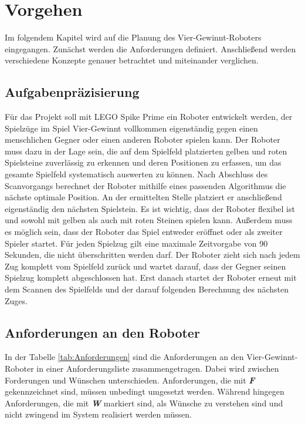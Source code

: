 \chapter{Vorgehen}
Im folgendem Kapitel wird auf die Planung des Vier-Gewinnt-Roboters eingegangen. Zunächst werden die Anforderungen definiert. Anschließend werden verschiedene Konzepte genauer betrachtet und miteinander verglichen.

\section{Aufgabenpräzisierung}
Für das Projekt soll mit LEGO Spike Prime ein Roboter entwickelt werden, der Spielzüge im Spiel Vier-Gewinnt vollkommen eigenständig gegen einen menschlichen Gegner oder einen anderen Roboter spielen kann. Der Roboter muss dazu in der Lage sein, die auf dem Spielfeld platzierten gelben und roten Spielsteine zuverlässig zu erkennen und deren Positionen zu erfassen, um das gesamte Spielfeld systematisch auswerten zu können.\newline
Nach Abschluss des Scanvorgangs berechnet der Roboter mithilfe eines passenden Algorithmus die nächste optimale Position. An der ermittelten Stelle platziert er anschließend eigenständig den nächsten Spielstein. Es ist wichtig, dass der Roboter flexibel ist und sowohl mit gelben als auch mit roten Steinen spielen kann. Außerdem muss es möglich sein, dass der Roboter das Spiel entweder eröffnet oder als zweiter Spieler startet.\newline
Für jeden Spielzug gilt eine maximale Zeitvorgabe von 90 Sekunden, die nicht überschritten werden darf. Der Roboter zieht sich nach jedem Zug komplett vom Spielfeld zurück und wartet darauf, dass der Gegner seinen Spielzug komplett abgeschlossen hat. Erst danach startet der Roboter erneut mit dem Scannen des Spielfelds und der darauf folgenden Berechnung des nächsten Zuges.


\section{Anforderungen an den Roboter}
In der Tabelle \ref{tab:Anforderungen} sind die Anforderungen an den Vier-Gewinnt-Roboter in einer Anforderungsliste zusammengetragen. Dabei wird zwischen Forderungen und Wünschen unterschieden. Anforderungen, die mit \textsl{\textbf{F}} gekennzeichnet sind, müssen unbedingt umgesetzt werden. Während hingegen Anforderungen, die mit \textsl{\textbf{W}} markiert sind, als Wünsche zu verstehen sind und nicht zwingend im System realisiert werden müssen.

